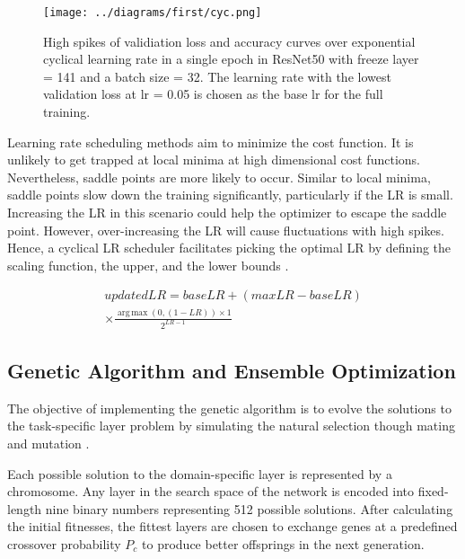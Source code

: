 \documentclass[a4paper, 12 pt, conference]{ieeeconf}
\DeclareMathOperator*{\argmax}{arg\,max}
\begin{document}
\begin{figure}[htbp]
\centering
\texttt{[image: ../diagrams/first/cyc.png]}
\caption{ High spikes of validiation loss and accuracy curves over exponential cyclical learning rate in a single epoch in ResNet50 with freeze layer = 141 and a batch size = 32. The learning rate with the lowest validation loss at lr = 0.05 is chosen as the base lr for the full training.}
\label{loss_spikes}
\end{figure}

\quad Learning rate scheduling methods aim to minimize the cost function. It is unlikely to get trapped at local minima at high dimensional cost functions. Nevertheless, saddle points are more likely to occur.  Similar to local minima, saddle points slow down the training significantly, particularly if the LR is small\cite{Smith2017a}.
\quad Increasing the LR in this scenario could help the optimizer to escape the saddle point. However, over-increasing the LR will cause fluctuations with high spikes.
Hence, a cyclical LR scheduler facilitates picking the optimal LR by defining the scaling function, the upper, and the lower bounds \cite{Smith2017a}.

\begin{equation} \label{eq1}
\begin{split}
updated LR = base LR + (max LR - base LR) \\
\times  \frac{\argmax(0, (1 - LR)) \times 1}{2^{LR-1}} \end{split}
\end{equation}

%
%

\subsection{Genetic Algorithm and Ensemble Optimization} \label{ga}
 \quad The objective of implementing the genetic algorithm is to evolve the solutions to the task-specific layer problem by simulating the natural selection though mating and mutation \cite{Singh2018}.

\quad Each possible solution to the domain-specific layer is represented by a chromosome. Any layer in the search space of the network is encoded into fixed-length nine binary numbers representing 512 possible solutions.
After calculating the initial fitnesses, the fittest layers are chosen to exchange genes at a predefined crossover probability $P_c$ to produce better offsprings in the next generation.
\end{document}
